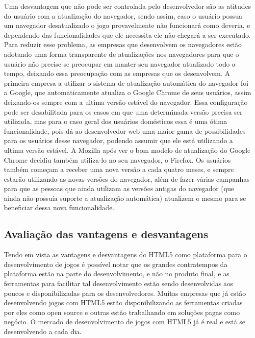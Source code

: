 Uma desvantagem que não pode ser controlada pelo desenvolvedor são as
atitudes do usuário com a atualização do navegador, sendo assim, caso
o usuário possua um navegador desatualizado o jogo provavelmente não
funcionará como deveria, e dependendo das funcionalidades que ele
necessita ele não chegará a ser executado. Para reduzir esse problema,
as empresas que desenvolvem os navegadores estão adotando uma forma
transparente de atualizações nos navegadores para que o usuário não
precise se preocupar em manter seu navegador atualizado todo o tempo,
deixando essa preocupação com as empresas que os desenvolvem.
A primeira empresa a utilizar o sistema de atualização automática do
navegador foi a Google, que automaticamente atualiza o Google Chrome
de seus usuários, assim deixando-os sempre com a ultima versão estável
do navegador. Essa configuração pode ser desabilitada para os casos em
que uma determinada versão precisa ser utilizada, mas para o caso
geral dos usuários domésticos essa é uma ótima funcionalidade, pois dá
ao desenvolvedor web uma maior gama de possibilidades para os usuários
desse navegador, podendo assumir que ele está utilizando a ultima
versão estável.
A Mozilla após ver o bom modelo de atualização do Google Chrome
decidiu também utiliza-lo no seu navegador, o Firefox. Os usuários
também começam a receber uma nova versão a cada quatro meses, e sempre
estarão utilizando as novas versões do navegador, além de fazer várias
campanhas para que as pessoas que ainda utilizam as versões antigas do navegador (que ainda
não possuía suporte a atualização automática) atualizem o mesmo para
se beneficiar dessa nova funcionalidade.

\subsection{Avaliação das vantagens e desvantagens}

Tendo em vista as vantagens e desvantagens do HTML5 como plataforma
para o desenvolvimento de jogos é possível notar que os grandes
contratempos da plataforma estão na parte do desenvolvimento, e não no
produto final, e as ferramentas para facilitar tal desenvolvimento
estão sendo desenvolvidas aos poucos e disponibilizadas para os
desenvolvedores. Muitas empresas que já estão desenvolvendo jogos com HTML5
estão disponibilizando as ferramentas criadas por eles como open source
e outras estão trabalhando em soluções pagas como negócio.
O mercado de desenvolvimento de jogos com HTML5 já é real e está se
desenvolvendo a cada dia.

